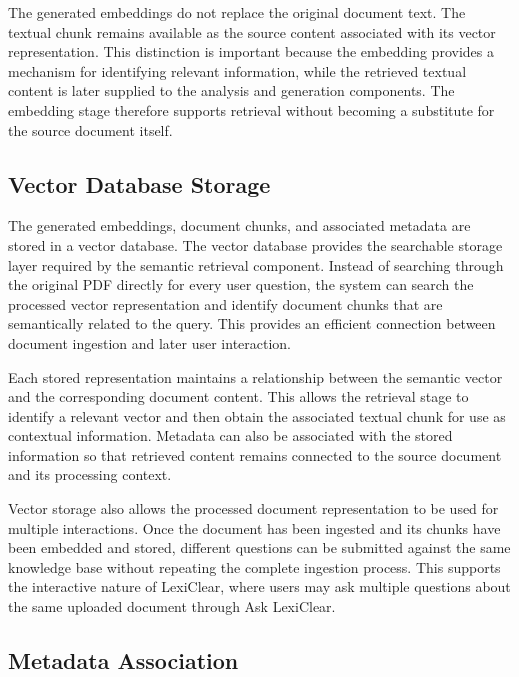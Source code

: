 \documentclass[12pt,a4paper,oneside]{report}
\begin{document}
The generated embeddings do not replace the original document text. The
textual chunk remains available as the source content associated with its
vector representation. This distinction is important because the embedding
provides a mechanism for identifying relevant information, while the
retrieved textual content is later supplied to the analysis and generation
components. The embedding stage therefore supports retrieval without
becoming a substitute for the source document itself.

\subsection{Vector Database Storage}

The generated embeddings, document chunks, and associated metadata are
stored in a vector database. The vector database provides the searchable
storage layer required by the semantic retrieval component. Instead of
searching through the original PDF directly for every user question, the
system can search the processed vector representation and identify document
chunks that are semantically related to the query. This provides an
efficient connection between document ingestion and later user interaction.

Each stored representation maintains a relationship between the semantic
vector and the corresponding document content. This allows the retrieval
stage to identify a relevant vector and then obtain the associated textual
chunk for use as contextual information. Metadata can also be associated
with the stored information so that retrieved content remains connected to
the source document and its processing context.

Vector storage also allows the processed document representation to be used
for multiple interactions. Once the document has been ingested and its
chunks have been embedded and stored, different questions can be submitted
against the same knowledge base without repeating the complete ingestion
process. This supports the interactive nature of LexiClear, where users may
ask multiple questions about the same uploaded document through Ask
LexiClear.

\subsection{Metadata Association}
\end{document}
